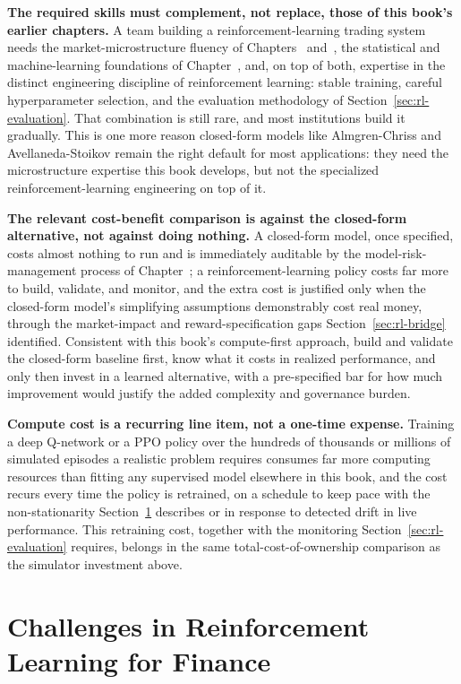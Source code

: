 \documentclass[../ai_in_finance]{subfiles}
\begin{document}
\textbf{The required skills must complement, not replace, those of this book's earlier chapters.} A team building a reinforcement-learning trading system needs the market-microstructure fluency of Chapters~ and~, the statistical and machine-learning foundations of Chapter~, and, on top of both, expertise in the distinct engineering discipline of reinforcement learning: stable training, careful hyperparameter selection, and the evaluation methodology of Section~\ref{sec:rl-evaluation}. That combination is still rare, and most institutions build it gradually. This is one more reason closed-form models like Almgren-Chriss and Avellaneda-Stoikov remain the right default for most applications: they need the microstructure expertise this book develops, but not the specialized reinforcement-learning engineering on top of it.

\textbf{The relevant cost-benefit comparison is against the closed-form alternative, not against doing nothing.} A closed-form model, once specified, costs almost nothing to run and is immediately auditable by the model-risk-management process of Chapter~; a reinforcement-learning policy costs far more to build, validate, and monitor, and the extra cost is justified only when the closed-form model's simplifying assumptions demonstrably cost real money, through the market-impact and reward-specification gaps Section~\ref{sec:rl-bridge} identified. Consistent with this book's compute-first approach, build and validate the closed-form baseline first, know what it costs in realized performance, and only then invest in a learned alternative, with a pre-specified bar for how much improvement would justify the added complexity and governance burden.

\textbf{Compute cost is a recurring line item, not a one-time expense.} Training a deep Q-network or a PPO policy over the hundreds of thousands or millions of simulated episodes a realistic problem requires consumes far more computing resources than fitting any supervised model elsewhere in this book, and the cost recurs every time the policy is retrained, on a schedule to keep pace with the non-stationarity Section~\ref{sec:rl-challenges} describes or in response to detected drift in live performance. This retraining cost, together with the monitoring Section~\ref{sec:rl-evaluation} requires, belongs in the same total-cost-of-ownership comparison as the simulator investment above.

\section{Challenges in Reinforcement Learning for Finance}
\label{sec:rl-challenges}
\end{document}
